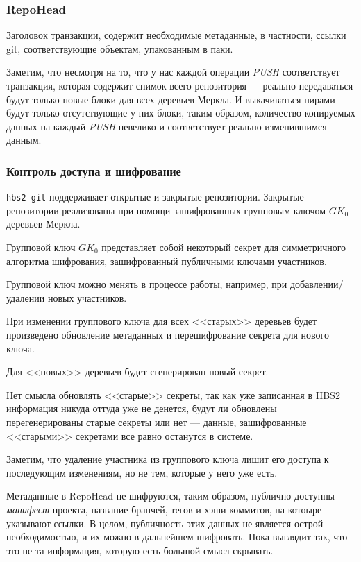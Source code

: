 \documentclass[11pt,a4paper]{article}
\begin{document}
\subsubsection*{RepoHead}

Заголовок транзакции, содержит необходимые метаданные, в частности, ссылки git, соответствующие
объектам, упакованным в паки.

Заметим, что несмотря на то, что у нас каждой операции \textit{PUSH} соответствует транзакция,
которая содержит снимок всего репозитория --- реально передаваться будут только новые блоки
для всех деревьев Меркла. И выкачиваться пирами будут только отсутствующие у них блоки, таким
образом, количество копируемых данных на каждый \textit{PUSH} невелико и соответствует реально
изменившимся данным.


\subsubsection*{Контроль доступа и шифрование}

\texttt{hbs2-git} поддерживает открытые и закрытые репозитории. Закрытые репозитории
реализованы при помощи зашифрованных групповым ключом $GK_0$ деревьев Меркла.

Групповой ключ $GK_0$ представляет собой некоторый секрет для симметричного алгоритма шифрования,
зашифрованный публичными ключами участников.

Групповой ключ можно менять в процессе работы, например, при добавлении/удалении новых участников.

При изменении группового ключа для всех <<старых>> деревьев будет произведено обновление метаданных
и перешифрование секрета для нового ключа.

Для <<новых>> деревьев будет сгенерирован новый секрет.

Нет смысла обновлять <<старые>> секреты, так как уже записанная в HBS2 информация никуда оттуда уже
не денется, будут ли обновлены перегенерированы старые секреты или нет --- данные, зашифрованные
<<старыми>> секретами все равно останутся в системе.

Заметим, что удаление участника из группового ключа лишит его доступа к последующим изменениям, но
не тем, которые у него уже есть.

Метаданные в RepoHead не шифруются, таким образом, публично доступны \textit{манифест} проекта,
название бранчей, тегов и хэши коммитов, на котоыре указывают ссылки. В целом, публичность этих
данных не является острой необходимостью, и их можно в дальнейшем шифровать. Пока выглядит так, что
это не та информация, которую есть большой смысл скрывать.
\end{document}
